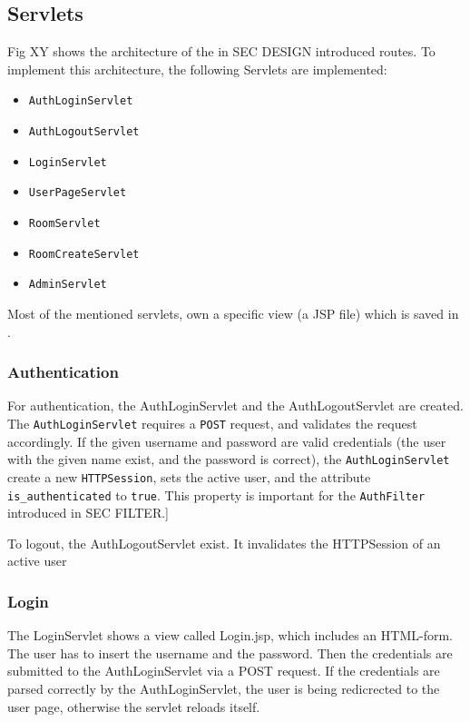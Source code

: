 %
%


\subsection{Servlets}\label{subsec:03_impl_servlets}
Fig XY shows the architecture of the in SEC DESIGN introduced routes. To implement this architecture, the following Servlets are implemented:
\begin{itemize}
\item \texttt{AuthLoginServlet}
\item \texttt{AuthLogoutServlet}
\item \texttt{LoginServlet}
\item \texttt{UserPageServlet}
\item \texttt{RoomServlet}
\item \texttt{RoomCreateServlet}
\item \texttt{AdminServlet}
\end{itemize}
Most of the mentioned servlets, own a specific view (a JSP file) which is saved in .


\subsubsection{Authentication}\label{subsubsec:03_impl_servlets_auth}
For authentication, the AuthLoginServlet and the AuthLogoutServlet are created.
The \texttt{AuthLoginServlet} requires a \texttt{POST} request, and validates the request accordingly. If the given username and password are valid credentials (the user with the given name exist, and the password is correct), the \texttt{AuthLoginServlet} create a new \texttt{HTTPSession}, sets the active user, and the attribute \texttt{is\_authenticated} to \texttt{true}. This property is important for the \texttt{AuthFilter} introduced in SEC FILTER.]

To logout, the AuthLogoutServlet exist. It invalidates the HTTPSession of an active user


\subsubsection{Login}\label{subsubsec:03_impl_servlets_login}
The LoginServlet shows a view called Login.jsp, which includes an HTML-form. The user has to insert the username and the password. Then the credentials are submitted to the AuthLoginServlet via a POST request.
If the credentials are parsed correctly by the AuthLoginServlet, the user is being redicrected to the user page, otherwise the servlet reloads itself.


